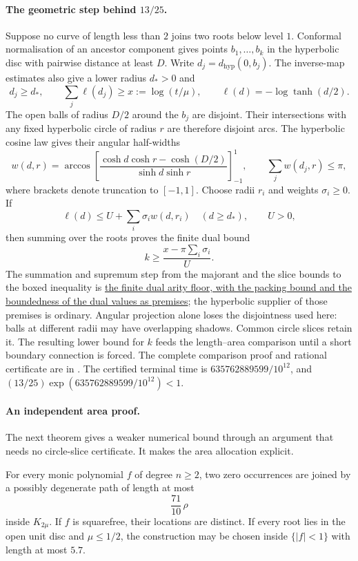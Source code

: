 \documentclass[11pt]{article}
\begin{document}
\paragraph{The geometric step behind $13/25$.}
Suppose no curve of length less than $2$ joins two roots below level $1$.
Conformal normalisation of an ancestor component gives points
$b_1,\ldots,b_k$ in the hyperbolic disc with pairwise distance at least $D$.
Write $d_j=d_{\mathrm{hyp}}(0,b_j)$.  The inverse-map estimates also give a
lower radius $d_*>0$ and
\[
 d_j\ge d_*,\qquad
 \sum_j\ell(d_j)\ge x:=\log(t/\mu),\qquad
 \ell(d)=-\log\tanh(d/2).
\]
The open balls of radius $D/2$ around the $b_j$ are disjoint.  Their
intersections with any fixed hyperbolic circle of radius $r$ are therefore
disjoint arcs.  The hyperbolic cosine law gives their angular half-widths
\[
 w(d,r)=\arccos\!\left[\frac{\cosh d\cosh r-\cosh(D/2)}
                              {\sinh d\sinh r}\right]_{-1}^{1},
 \qquad \sum_j w(d_j,r)\le\pi,
\]
where brackets denote truncation to $[-1,1]$.  Choose radii $r_i$ and weights
$\sigma_i\ge0$.  If
\[
 \ell(d)\le U+\sum_i\sigma_iw(d,r_i)\quad(d\ge d_*),\qquad U>0,
\]
then summing over the roots proves the finite dual bound
\[
 \boxed{\quad k\ge\frac{x-\pi\sum_i\sigma_i}{U}.\quad}
\]
The summation and supremum step from the majorant and the slice bounds to the
boxed inequality is
\href{https://github.com/wcook04/plectis-erdos/blob/f36a98bf3d3e6f65f1074e3b800e3293d5b8a51a/ErdosProblems/Erdos1041/PaperFiniteDual.lean#L68}{the finite dual
arity floor, with the packing bound and the boundedness of the dual values as
premises}; the hyperbolic supplier of those premises is ordinary.
Angular projection alone loses the disjointness used here: balls at different
radii may have overlapping shadows.  Common circle slices retain it.
The resulting lower bound for $k$ feeds the length--area comparison until a
short boundary connection is forced.  The complete comparison proof and
rational certificate are in
.
The certified terminal time is $635762889599/10^{12}$, and
$(13/25)\exp(635762889599/10^{12})<1$.

\paragraph{An independent area proof.}
The next theorem gives a weaker numerical bound through an argument that
needs no circle-slice certificate.  It makes the area allocation explicit.

\begin{theorem}
\label{res:constant-factor-path}
For every monic polynomial $f$ of degree $n\ge2$, two zero occurrences are
joined by a possibly degenerate path of length at most
\[
 \frac{71}{10}\,\rho
\]
inside $K_{2\mu}$.  If $f$ is squarefree, their locations are distinct.
If every root lies in the open unit disc and $\mu\le1/2$, the construction
may be chosen inside $\{|f|<1\}$ with length at most $5.7$.
\end{theorem}
\end{document}
